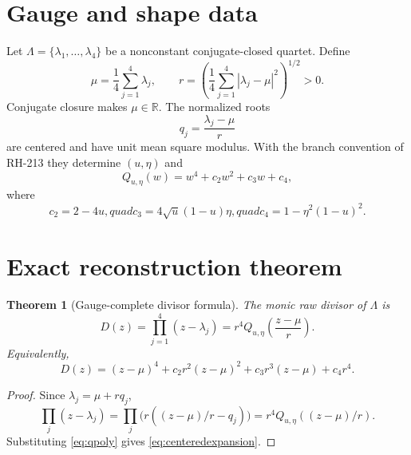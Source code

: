 \documentclass[12pt]{article}
\newtheorem{theorem}{Theorem}[section]\newtheorem{proposition}[theorem]{Proposition}
\theoremstyle{remark}\newtheorem{remark}[theorem]{Remark}
\begin{document}
\section{Gauge and shape data}

Let $\Lambda=\{\lambda_1,\ldots,\lambda_4\}$ be a nonconstant conjugate-closed
quartet.  Define
\begin{equation}\label{eq:gauge}
 \mu=\frac14\sum_{j=1}^{4}\lambda_j,
 \qquad
 r=\left(\frac14\sum_{j=1}^{4}|\lambda_j-\mu|^2\right)^{1/2}>0.
\end{equation}
Conjugate closure makes $\mu\in\mathbb R$.  The normalized roots
\begin{equation}
 q_j=\frac{\lambda_j-\mu}{r}
\end{equation}
are centered and have unit mean square modulus.  With the branch convention
of RH-213 they determine $(u,\eta)$ and
\begin{equation}\label{eq:qpoly}
 Q_{u,\eta}(w)=w^4+c_2w^2+c_3w+c_4,
\end{equation}
where
\begin{equation}\label{eq:shapecoeff}
 c_2=2-4u,quad
 c_3=4\sqrt u(1-u)\eta,quad
 c_4=1-\eta^2(1-u)^2.
\end{equation}

\section{Exact reconstruction theorem}

\begin{theorem}[Gauge-complete divisor formula]\label{thm:reconstruct}
The monic raw divisor of $\Lambda$ is
\begin{equation}\label{eq:master}
 \boxed{
 D(z)=\prod_{j=1}^{4}(z-\lambda_j)
 =r^4Q_{u,\eta}\!\left(\frac{z-\mu}{r}\right).}
\end{equation}
Equivalently,
\begin{equation}\label{eq:centeredexpansion}
 D(z)=(z-\mu)^4+c_2r^2(z-\mu)^2
      +c_3r^3(z-\mu)+c_4r^4.
\end{equation}
\end{theorem}
\begin{proof}
Since $\lambda_j=\mu+rq_j$,
\begin{equation}
 \prod_j(z-\lambda_j)
 =\prod_j\bigl(r((z-\mu)/r-q_j)\bigr)
 =r^4Q_{u,\eta}((z-\mu)/r).
\end{equation}
Substituting \eqref{eq:qpoly} gives \eqref{eq:centeredexpansion}.
\end{proof}
\end{document}
